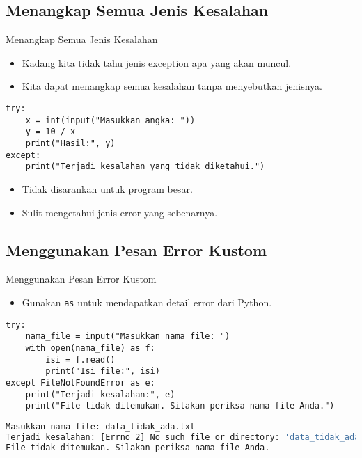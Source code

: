 \documentclass[aspectratio=169, table]{beamer}
\begin{document}
\subsection*{Menangkap Semua Jenis Kesalahan}
\begin{frame}[fragile]{Menangkap Semua Jenis Kesalahan}
\vspace*{20pt}
\begin{itemize}
  \item Kadang kita tidak tahu jenis exception apa yang akan muncul.
  \item Kita dapat menangkap semua kesalahan tanpa menyebutkan jenisnya.
\end{itemize}

\begin{lstlisting}[style=PythonStyle]
try:
    x = int(input("Masukkan angka: "))
    y = 10 / x
    print("Hasil:", y)
except:
    print("Terjadi kesalahan yang tidak diketahui.")
\end{lstlisting}

\begin{itemize}
  \item Tidak disarankan untuk program besar.
  \item Sulit mengetahui jenis error yang sebenarnya.
\end{itemize}
\end{frame}

\subsection*{Menggunakan Pesan Error Kustom}
\begin{frame}[fragile]{Menggunakan Pesan Error Kustom}
\vspace*{20pt}
\begin{itemize}
  \item Gunakan \texttt{as} untuk mendapatkan detail error dari Python.
\end{itemize}

\begin{lstlisting}[style=PythonStyle]
try:
    nama_file = input("Masukkan nama file: ")
    with open(nama_file) as f:
        isi = f.read()
        print("Isi file:", isi)
except FileNotFoundError as e:
    print("Terjadi kesalahan:", e)
    print("File tidak ditemukan. Silakan periksa nama file Anda.")
\end{lstlisting}

\begin{lstlisting}[language=bash]
Masukkan nama file: data_tidak_ada.txt
Terjadi kesalahan: [Errno 2] No such file or directory: 'data_tidak_ada.txt'
File tidak ditemukan. Silakan periksa nama file Anda.
\end{lstlisting}
\end{frame}
\end{document}
